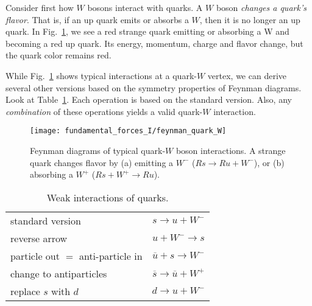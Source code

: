 Consider first how $W$ bosons interact with quarks.  A $W$ boson
{\em changes a quark's flavor}.  That is, if an up quark emits or
absorbs a $W$, then it is no longer an up quark.  In
Fig.~\ref{fig:feynman_quark_W}, we see a red strange quark
emitting or absorbing a W and becoming a red up quark.  Its
energy, momentum, charge and flavor change, but the quark color
remains red.

While Fig.~\ref{fig:feynman_quark_W} shows typical interactions at
a quark-$W$ vertex, we can derive several other versions based on
the symmetry properties of Feynman diagrams.  Look at
Table~\ref{table:weak_quarks}.  Each operation is based on the
standard version.  Also, any {\em combination} of these operations
yields a valid quark-$W$ interaction.

\begin{figure}[!b]
\begin{center}
\begin{minipage}{10cm}
\begin{center}
\texttt{[image: fundamental\_forces\_I/feynman\_quark\_W]}
\caption{Feynman diagrams of typical quark-$W$ boson interactions.
A
  strange quark changes flavor by (a) emitting a $W^-$ ($Rs \rightarrow
Ru + W^-$), or (b) absorbing a $W^+$ ($Rs + W^+ \rightarrow Ru$).}
\label{fig:feynman_quark_W}
\end{center}
\end{minipage}
\end{center}
\end{figure}


\begin{table}[!b]
\begin{center}
\caption{Weak interactions of quarks.} \label{table:weak_quarks}
\begin{tabular}[tbp]{lc}
\hline
standard version & $s \to u + W^-$ \\[0.5ex]
reverse arrow    & $u + W^- \to s$ \\[0.5ex]
particle out $=$ anti-particle in & $\overline u + s \to W^-$ \\[0.5ex]
change to antiparticles & $\overline s \to \overline u + W^+$ \\[0.5ex]
replace $s$ with $d$ & $d \to u + W^-$ \\
\hline
\end{tabular}
\end{center}
\end{table}

\newpage

